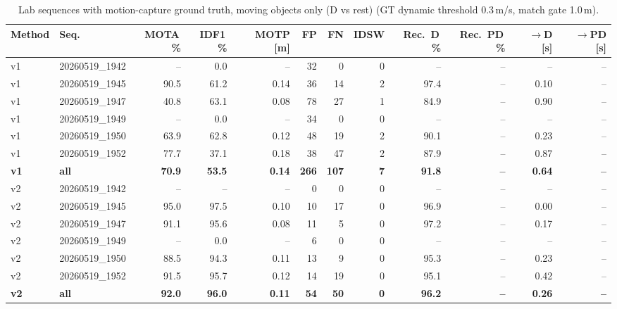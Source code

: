 \begin{table}[t]
\centering
\caption{Lab sequences with motion-capture ground truth, moving objects only (D vs rest) (GT dynamic threshold 0.3\,m/s, match gate 1.0\,m).}
\label{tab:own_r9a_dynamic_only}
\setlength{\tabcolsep}{3pt}
\begin{tabular}{llrrrrrrrrrr}
\toprule
Method & Seq. & MOTA\,\% & IDF1\,\% & MOTP [m] & FP & FN & IDSW & Rec.\ D\,\% & Rec.\ PD\,\% & $\to$D [s] & $\to$PD [s] \\
\midrule
v1 & 20260519\_1942 & -- & 0.0 & -- & 32 & 0 & 0 & -- & -- & -- & -- \\
v1 & 20260519\_1945 & 90.5 & 61.2 & 0.14 & 36 & 14 & 2 & 97.4 & -- & 0.10 & -- \\
v1 & 20260519\_1947 & 40.8 & 63.1 & 0.08 & 78 & 27 & 1 & 84.9 & -- & 0.90 & -- \\
v1 & 20260519\_1949 & -- & 0.0 & -- & 34 & 0 & 0 & -- & -- & -- & -- \\
v1 & 20260519\_1950 & 63.9 & 62.8 & 0.12 & 48 & 19 & 2 & 90.1 & -- & 0.23 & -- \\
v1 & 20260519\_1952 & 77.7 & 37.1 & 0.18 & 38 & 47 & 2 & 87.9 & -- & 0.87 & -- \\
\textbf{v1} & \textbf{all} & \textbf{70.9} & \textbf{53.5} & \textbf{0.14} & \textbf{266} & \textbf{107} & \textbf{7} & \textbf{91.8} & \textbf{--} & \textbf{0.64} & \textbf{--} \\
\midrule
v2 & 20260519\_1942 & -- & -- & -- & 0 & 0 & 0 & -- & -- & -- & -- \\
v2 & 20260519\_1945 & 95.0 & 97.5 & 0.10 & 10 & 17 & 0 & 96.9 & -- & 0.00 & -- \\
v2 & 20260519\_1947 & 91.1 & 95.6 & 0.08 & 11 & 5 & 0 & 97.2 & -- & 0.17 & -- \\
v2 & 20260519\_1949 & -- & 0.0 & -- & 6 & 0 & 0 & -- & -- & -- & -- \\
v2 & 20260519\_1950 & 88.5 & 94.3 & 0.11 & 13 & 9 & 0 & 95.3 & -- & 0.23 & -- \\
v2 & 20260519\_1952 & 91.5 & 95.7 & 0.12 & 14 & 19 & 0 & 95.1 & -- & 0.42 & -- \\
\textbf{v2} & \textbf{all} & \textbf{92.0} & \textbf{96.0} & \textbf{0.11} & \textbf{54} & \textbf{50} & \textbf{0} & \textbf{96.2} & \textbf{--} & \textbf{0.26} & \textbf{--} \\
\bottomrule
\end{tabular}
\end{table}

